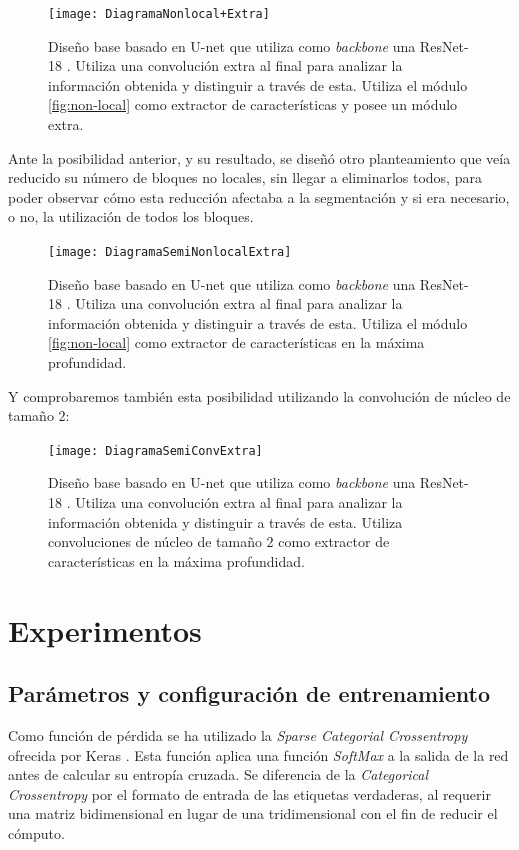 \begin{figure}[h]
  \centering
  \texttt{[image: DiagramaNonlocal+Extra]}
  \caption{Diseño base basado en U-net \cite{2015arXiv150504597R} que utiliza como \emph{backbone} una ResNet-18 \cite{DBLP:journals/corr/HeZRS15}. Utiliza una convolución extra al final para analizar la información obtenida y distinguir a través de esta. Utiliza el módulo \autoref{fig:non-local} como extractor de características y posee un módulo extra.}
  \label{fig:DiagramaNonlocal+Extra}
\end{figure}

\newpage
Ante la posibilidad anterior, y su resultado, se diseñó otro planteamiento que veía reducido su número de bloques no locales, sin llegar a eliminarlos todos, para poder observar cómo esta reducción afectaba a la segmentación y si era necesario, o no, la utilización de todos los bloques.\\

\begin{figure}[h]
  \centering
  \texttt{[image: DiagramaSemiNonlocalExtra]}
  \caption{Diseño base basado en U-net \cite{2015arXiv150504597R} que utiliza como \emph{backbone} una ResNet-18 \cite{DBLP:journals/corr/HeZRS15}. Utiliza una convolución extra al final para analizar la información obtenida y distinguir a través de esta. Utiliza el módulo \autoref{fig:non-local} como extractor de características en la máxima profundidad.}
  \label{fig:DiagramaSemiNonlocalExtra}
\end{figure}

\newpage
Y comprobaremos también esta posibilidad utilizando la convolución de núcleo de tamaño $2$:
\begin{figure}[h]
  \centering
  \texttt{[image: DiagramaSemiConvExtra]}
  \caption{Diseño base basado en U-net \cite{2015arXiv150504597R} que utiliza como \emph{backbone} una ResNet-18 \cite{DBLP:journals/corr/HeZRS15}. Utiliza una convolución extra al final para analizar la información obtenida y distinguir a través de esta. Utiliza convoluciones de núcleo de tamaño $2$ como extractor de características en la máxima profundidad.}
  \label{fig:DiagramaSemiConvExtra}
\end{figure}

\chapter{Experimentos}

\section{Parámetros y configuración de entrenamiento}
Como función de pérdida se ha utilizado la \emph{Sparse Categorial Crossentropy} ofrecida por Keras \cite{chollet2015keras}. Esta función aplica una función \emph{SoftMax} a la salida de la red antes de calcular su entropía cruzada. Se diferencia de la \emph{Categorical Crossentropy} por el formato de entrada de las etiquetas verdaderas, al requerir una matriz bidimensional en lugar de una tridimensional con el fin de reducir el cómputo. \\

